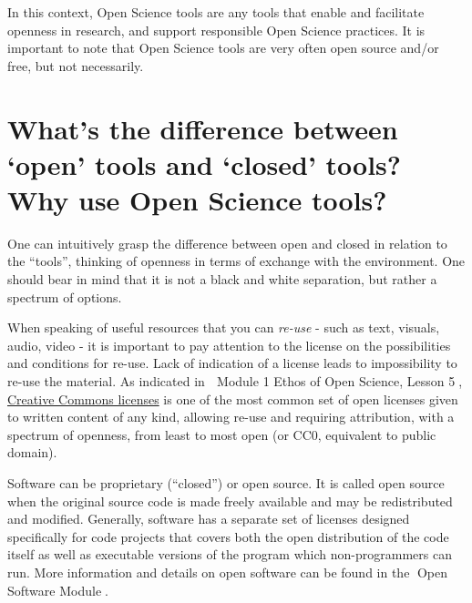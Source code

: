 \documentclass[
  letterpaper,
  DIV=11,
  numbers=noendperiod]{scrreport}
\begin{document}
In this context, Open Science tools are any tools that enable and
facilitate openness in research, and support responsible Open Science
practices. It is important to note that Open Science tools are very
often open source and/or free, but not necessarily.

\hypertarget{whats-the-difference-between-open-tools-and-closed-tools-why-use-open-science-tools}{%
\section*{What's the difference between `open' tools and `closed' tools?
Why use Open Science
tools?}\label{whats-the-difference-between-open-tools-and-closed-tools-why-use-open-science-tools}}


One can intuitively grasp the difference between open and closed in
relation to the ``tools'', thinking of openness in terms of exchange
with the environment. One should bear in mind that it is not a black and
white separation, but rather a spectrum of options.

When speaking of useful resources that you can \emph{re-use} - such as
text, visuals, audio, video - it is important to pay attention to the
license on the possibilities and conditions for re-use. Lack of
indication of a license leads to impossibility to re-use the material.
As indicated in 🔗 Module 1 Ethos of Open Science, Lesson 5🔗,
\href{https://creativecommons.org/}{Creative Commons licenses} is one of
the most common set of open licenses given to written content of any
kind, allowing re-use and requiring attribution, with a spectrum of
openness, from least to most open (or CC0, equivalent to public domain).

Software can be proprietary (``closed'') or open source. It is called
open source when the original source code is made freely available and
may be redistributed and modified. Generally, software has a separate
set of licenses designed specifically for code projects that covers both
the open distribution of the code itself as well as executable versions
of the program which non-programmers can run. More information and
details on open software can be found in the 🔗Open Software Module🔗.
\end{document}
